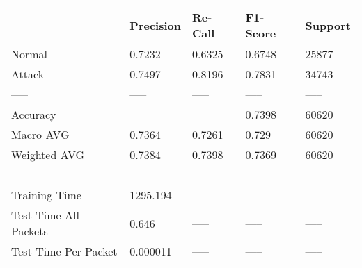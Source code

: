 \begin{tabular}{lllll}
\toprule
{} & Precision & Re-Call & F1-Score & Support \\
\midrule
Normal                &    0.7232 &  0.6325 &   0.6748 &   25877 \\
Attack                &    0.7497 &  0.8196 &   0.7831 &   34743 \\
-----                 &     ----- &   ----- &    ----- &   ----- \\
Accuracy              &           &         &   0.7398 &   60620 \\
Macro AVG             &    0.7364 &  0.7261 &    0.729 &   60620 \\
Weighted AVG          &    0.7384 &  0.7398 &   0.7369 &   60620 \\
-----                 &     ----- &   ----- &    ----- &   ----- \\
Training Time         &  1295.194 &   ----- &    ----- &   ----- \\
Test Time-All Packets &     0.646 &   ----- &    ----- &   ----- \\
Test Time-Per Packet  &  0.000011 &   ----- &    ----- &   ----- \\
\bottomrule
\end{tabular}
